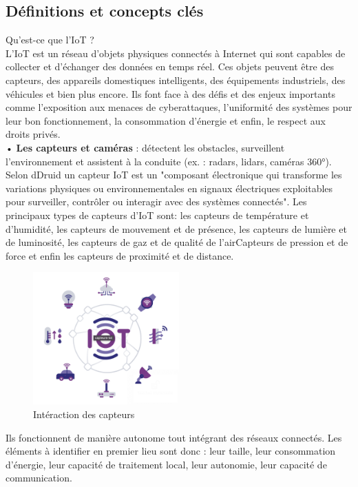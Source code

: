 \documentclass{article}
\begin{document}
\subsection{Définitions et concepts clés}
Qu'est-ce que l'IoT ?\\
L'IoT est un réseau d’objets physiques connectés à Internet qui sont capables de collecter et d’échanger des données en temps réel. Ces objets peuvent être des capteurs, des appareils domestiques intelligents, des équipements industriels, des véhicules et bien plus encore. Ils font face à des défis et des enjeux importants comme l'exposition aux menaces de cyberattaques, l'uniformité des systèmes pour leur bon fonctionnement, la consommation d'énergie et enfin, le respect aux droits privés. \\
• \textbf{Les capteurs et caméras} : détectent les obstacles, surveillent l’environnement et assistent à la conduite (ex. : radars, lidars, caméras 360°). Selon dDruid\cite{capteur} un capteur IoT est un "composant électronique qui transforme les variations physiques ou environnementales en signaux électriques exploitables pour surveiller, contrôler ou interagir avec des systèmes connectés".
Les principaux types de capteurs d'IoT sont: les capteurs de température et d'humidité, les capteurs de mouvement et de présence, les capteurs de lumière et de luminosité, les capteurs de gaz et de qualité de l’airCapteurs de pression et de force et enfin les capteurs de proximité et de distance.
\begin{figure}[H]
    \centering
    \includegraphics[width=0.5\textwidth]{images/capteur.png} 
    \caption{Intéraction des capteurs}
\end{figure}
Ils fonctionnent de manière autonome tout intégrant des réseaux connectés. Les éléments à identifier en premier lieu sont donc : leur taille, leur consommation d’énergie, leur capacité de traitement local, leur autonomie, leur capacité de communication.\\
\end{document}
